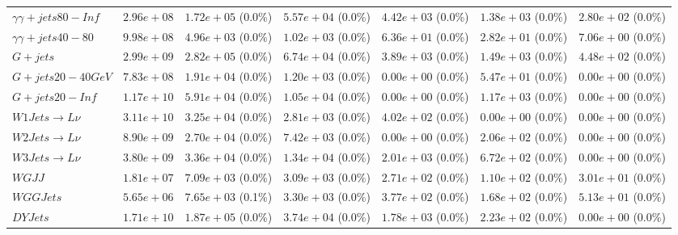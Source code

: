 \begin{landscape}
\begin{table}[h!]
\begin{tabular}{ |l|c|c|c|c|c|c| }
              $\gamma\gamma + jets 80-Inf$ &  $2.96e+08$ &   $1.72e+05$ (0.0\%) &  $5.57e+04$ (0.0\%) &  $4.42e+03$ (0.0\%) &    $1.38e+03$ (0.0\%) &    $2.80e+02$ (0.0\%) \\
               $\gamma\gamma + jets 40-80$ &  $9.98e+08$ &   $4.96e+03$ (0.0\%) &  $1.02e+03$ (0.0\%) &  $6.36e+01$ (0.0\%) &    $2.82e+01$ (0.0\%) &    $7.06e+00$ (0.0\%) \\
                                  $G+jets$ &  $2.99e+09$ &   $2.82e+05$ (0.0\%) &  $6.74e+04$ (0.0\%) &  $3.89e+03$ (0.0\%) &    $1.49e+03$ (0.0\%) &    $4.48e+02$ (0.0\%) \\
                         $G+jets 20-40GeV$ &  $7.83e+08$ &   $1.91e+04$ (0.0\%) &  $1.20e+03$ (0.0\%) &  $0.00e+00$ (0.0\%) &    $5.47e+01$ (0.0\%) &    $0.00e+00$ (0.0\%) \\
                           $G+jets 20-Inf$ &  $1.17e+10$ &   $5.91e+04$ (0.0\%) &  $1.05e+04$ (0.0\%) &  $0.00e+00$ (0.0\%) &    $1.17e+03$ (0.0\%) &    $0.00e+00$ (0.0\%) \\
                 $W1Jets \rightarrow L\nu$ &  $3.11e+10$ &   $3.25e+04$ (0.0\%) &  $2.81e+03$ (0.0\%) &  $4.02e+02$ (0.0\%) &    $0.00e+00$ (0.0\%) &    $0.00e+00$ (0.0\%) \\
                 $W2Jets \rightarrow L\nu$ &  $8.90e+09$ &   $2.70e+04$ (0.0\%) &  $7.42e+03$ (0.0\%) &  $0.00e+00$ (0.0\%) &    $2.06e+02$ (0.0\%) &    $0.00e+00$ (0.0\%) \\
                 $W3Jets \rightarrow L\nu$ &  $3.80e+09$ &   $3.36e+04$ (0.0\%) &  $1.34e+04$ (0.0\%) &  $2.01e+03$ (0.0\%) &    $6.72e+02$ (0.0\%) &    $0.00e+00$ (0.0\%) \\
                                    $WGJJ$ &  $1.81e+07$ &   $7.09e+03$ (0.0\%) &  $3.09e+03$ (0.0\%) &  $2.71e+02$ (0.0\%) &    $1.10e+02$ (0.0\%) &    $3.01e+01$ (0.0\%) \\
                                 $WGGJets$ &  $5.65e+06$ &   $7.65e+03$ (0.1\%) &  $3.30e+03$ (0.0\%) &  $3.77e+02$ (0.0\%) &    $1.68e+02$ (0.0\%) &    $5.13e+01$ (0.0\%) \\
                                  $DYJets$ &  $1.71e+10$ &   $1.87e+05$ (0.0\%) &  $3.74e+04$ (0.0\%) &  $1.78e+03$ (0.0\%) &    $2.23e+02$ (0.0\%) &    $0.00e+00$ (0.0\%) \\
    \hline
\end{tabular}
\label{semileptonic_cutflow}
\end{table}
\end{landscape}

